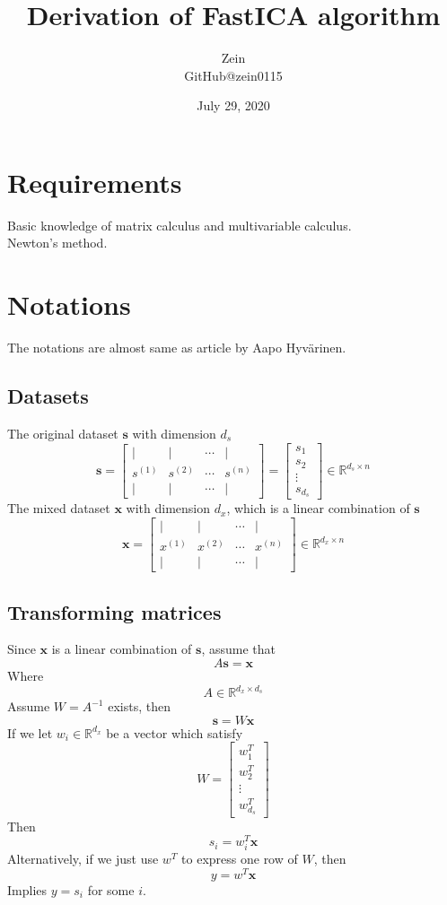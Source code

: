 \documentclass[11pt]{article}
\title{Derivation of FastICA algorithm}
\author{Zein\\GitHub@zein0115}
\date{July 29, 2020}
\begin{document}
\maketitle

\section{Requirements}
Basic knowledge of matrix calculus and multivariable calculus.\\
Newton's method.

\section{Notations}
The notations are almost same as article by Aapo Hyvärinen.
\subsection{Datasets}
The original dataset $\mathbf{s}$ with dimension $d_s$
$$
\mathbf{s} = 
\left[
    \begin{matrix}
        | & | &  \cdots & | \\
        s^{(1)} & s^{(2)} &  \cdots & s^{(n)}\\
        | & | &  \cdots & |
    \end{matrix}
\right] = 
\left[
    \begin{matrix}
        s_1\\s_2\\\vdots\\s_{d_s}
    \end{matrix}
\right]
\in \mathbb{R}^{d_s\times n}
$$
The mixed dataset $\mathbf{x}$ with dimension $d_x$, which is a linear combination of $\mathbf{s}$
$$
\mathbf{x} = 
\left[
    \begin{matrix}
        | & | &  \cdots & | \\
        x^{(1)} & x^{(2)} &  \cdots & x^{(n)}\\
        | & | &  \cdots & |
    \end{matrix}
\right]
\in \mathbb{R}^{d_x\times n}
$$
\subsection{Transforming matrices}
Since $\mathbf{x}$ is a linear combination of $\mathbf{s}$, assume that 
$$
A\mathbf{s} = \mathbf{x}
$$
Where
$$
    A\in\mathbb{R}^{d_x\times d_s}
$$
Assume $W = A^{-1}$ exists, then
$$
\mathbf{s} = W\mathbf{x}
$$
If we let $w_i\in\mathbb{R}^{d_x}$ be a vector which satisfy
$$
W = \left[
    \begin{matrix}
        w_1^T\\w_2^T\\\vdots\\w_{d_s}^T
    \end{matrix}
\right]
$$
Then
$$
s_i = w_i^T\mathbf{x}
$$
Alternatively, if we just use $w^T$ to express one row of $W$, then
$$
y = w^T\mathbf{x}
$$
Implies $y=s_i$ for some $i$.
\end{document}
